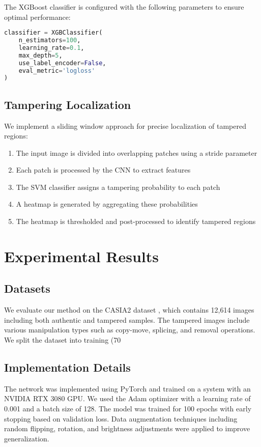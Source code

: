 \documentclass[conference]{IEEEtran}
\begin{document}
The XGBoost classifier is configured with the following parameters to ensure optimal performance:

\begin{lstlisting}[language=Python, caption=XGBoost Classifier Configuration]
classifier = XGBClassifier(
    n_estimators=100,
    learning_rate=0.1,
    max_depth=5,
    use_label_encoder=False,
    eval_metric='logloss'
)
\end{lstlisting}

\subsection{Tampering Localization}
We implement a sliding window approach for precise localization of tampered regions:

\begin{enumerate}
    \item The input image is divided into overlapping patches using a stride parameter
    \item Each patch is processed by the CNN to extract features
    \item The SVM classifier assigns a tampering probability to each patch
    \item A heatmap is generated by aggregating these probabilities
    \item The heatmap is thresholded and post-processed to identify tampered regions
\end{enumerate}



\section{Experimental Results}

\subsection{Datasets}
We evaluate our method on the CASIA2 dataset \cite{dong2013}, which contains 12,614 images including both authentic and tampered samples. The tampered images include various manipulation types such as copy-move, splicing, and removal operations. We split the dataset into training (70%

\subsection{Implementation Details}
The network was implemented using PyTorch and trained on a system with an NVIDIA RTX 3080 GPU. We used the Adam optimizer with a learning rate of 0.001 and a batch size of 128. The model was trained for 100 epochs with early stopping based on validation loss. Data augmentation techniques including random flipping, rotation, and brightness adjustments were applied to improve generalization.
\end{document}
